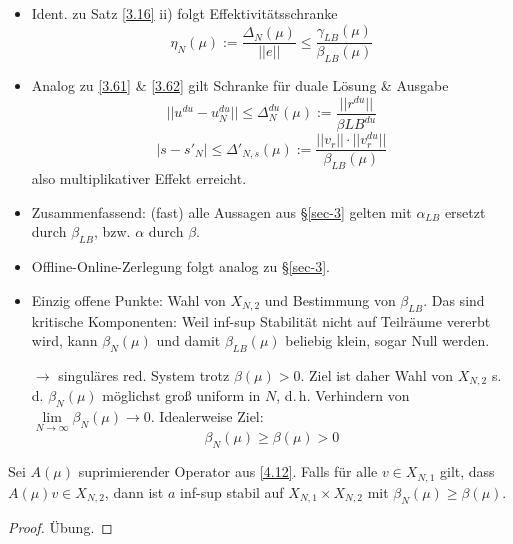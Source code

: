 \begin{bem} \beginwithlistbem
	\begin{itemize}
		\item Ident. zu Satz \ref{3.16} ii) folgt Effektivitätsschranke
		\[
			\eta_N(\mu) := \frac{\Delta_N(\mu)}{||e||} \leq \frac{\gamma_{LB}(\mu)}{\beta_{LB}(\mu)}
		\]
		\item Analog zu \ref{3.61} \& \ref{3.62} gilt Schranke für duale Lösung \& Ausgabe
		\[
			||u^{du} - u_N^{du}|| \leq \Delta_N^{du}(\mu) := \frac{||r^{du}||}{\beta{LB}^{du}}
		\]
		\[
			|s - s'_N| \leq \Delta'_{N,s}(\mu) := \frac{||v_r|| \cdot ||v_r^{du}||}{\beta_{LB}(\mu)}
		\]
		also multiplikativer Effekt erreicht.
		\item Zusammenfassend: (fast) alle Aussagen aus §\ref{sec-3} gelten mit $\alpha_{LB}$ ersetzt durch $\beta_{LB}$, bzw. $\alpha$ durch $\beta$.
		\item Offline-Online-Zerlegung folgt analog zu §\ref{sec-3}.
		\item Einzig offene Punkte: Wahl von $X_{N,2}$ und Bestimmung von $\beta_{LB}$. Das sind kritische Komponenten: Weil inf-sup Stabilität nicht auf Teilräume vererbt wird, kann $\beta_N(\mu)$ und damit $\beta_{LB}(\mu)$ beliebig klein, sogar Null werden.
		
		$\rightarrow$ singuläres red. System trotz $\beta(\mu) > 0$. Ziel ist daher Wahl von $X_{N,2}$ s.\,d. $\beta_N(\mu)$ möglichst groß uniform in $N$, d.\,h. Verhindern von $\lim\limits_{N \rightarrow \infty} \beta_N(\mu) \rightarrow 0$. Idealerweise Ziel:
		\[
			\beta_N(\mu) \geq \beta(\mu) > 0
		\]
	\end{itemize}
\end{bem}

\begin{satz} \label{4.20}
Sei $A(\mu)$ suprimierender Operator aus \ref{4.12}. Falls für alle $v \in X_{N,1}$ gilt, dass $A(\mu)v \in X_{N,2}$, dann ist $a$ inf-sup stabil auf $X_{N,1} \times X_{N,2}$ mit $\beta_N(\mu) \geq \beta(\mu)$.
\begin{proof}
Übung.
\end{proof}
\end{satz}

